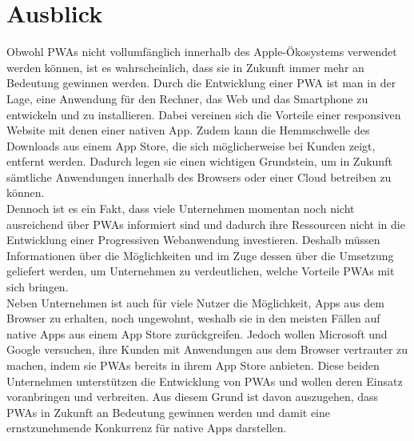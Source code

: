 \chapter{Ausblick}
Obwohl PWAs nicht vollumfänglich innerhalb des Apple-Ökosystems verwendet werden können, ist es wahrscheinlich, dass sie in Zukunft immer mehr an Bedeutung gewinnen werden. Durch die Entwicklung einer PWA ist man in der Lage, eine Anwendung für den Rechner, das Web und das Smartphone zu entwickeln und zu installieren. Dabei vereinen sich die Vorteile einer responsiven Website mit denen einer nativen App. Zudem kann die Hemmschwelle des Downloads aus einem App Store, die sich möglicherweise bei Kunden zeigt, entfernt werden. Dadurch legen sie einen wichtigen Grundstein, um in Zukunft sämtliche Anwendungen innerhalb des Browsers oder einer Cloud betreiben zu können.\\
Dennoch ist es ein Fakt, dass viele Unternehmen momentan noch nicht ausreichend über PWAs informiert sind und dadurch ihre Ressourcen nicht in die Entwicklung einer Progressiven Webanwendung investieren. Deshalb müssen Informationen über die Möglichkeiten und im Zuge dessen über die Umsetzung geliefert werden, um Unternehmen zu verdeutlichen, welche Vorteile PWAs mit sich bringen.\\
Neben Unternehmen ist auch für viele Nutzer die Möglichkeit, Apps aus dem Browser zu erhalten, noch ungewohnt, weshalb sie in den meisten Fällen auf native Apps aus einem App Store zurückgreifen. Jedoch wollen Microsoft und Google versuchen, ihre Kunden mit Anwendungen aus dem Browser vertrauter zu machen, indem sie PWAs bereits in ihrem App Store anbieten. Diese beiden Unternehmen unterstützen die Entwicklung von PWAs und wollen deren Einsatz voranbringen und verbreiten. Aus diesem Grund ist davon auszugehen, dass PWAs in Zukunft an Bedeutung gewinnen werden und damit eine ernstzunehmende Konkurrenz für native Apps darstellen. 
